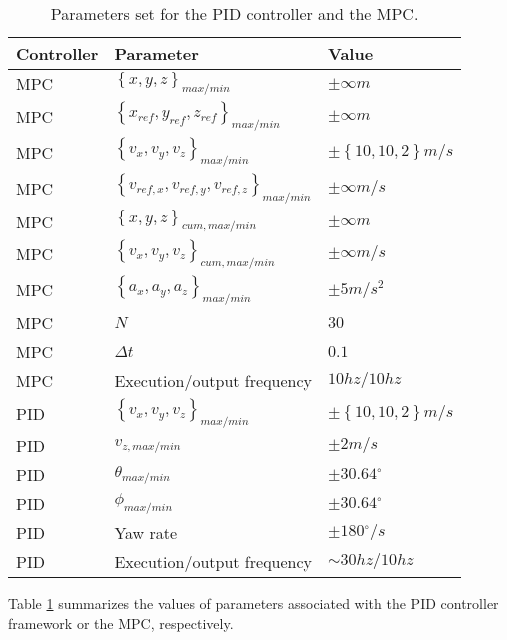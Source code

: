 \begin{table}[]
\center
\small
\caption{Parameters set for the PID controller and the MPC. \label{tab:controller_constraints}}
\begin{tabular}{@{}lll@{}}
\toprule
Controller& Parameter           & Value \\ \midrule
MPC & $ \left\lbrace x,y,z \right\rbrace_{max/min} $ & $\pm \infty \si{m}$ \\
MPC & $ \left\lbrace x_{ref},y_{ref},z_{ref} \right\rbrace_{max/min} $ & $\pm \infty \si{m}$ \\
MPC &$ \left\lbrace v_x,v_y,v_z \right\rbrace_{max/min} $ & $\pm \left\lbrace 10,10, 2\right\rbrace \si{m/s}$ \\
MPC &$ \left\lbrace v_{ref,x},v_{ref,y},v_{ref,z} \right\rbrace_{max/min} $ & $\pm \infty \si{m/s}$ \\
MPC &$ \left\lbrace x,y,z \right\rbrace_{cum,max/min} $ & $\pm \infty \si{m}$ \\
MPC &$ \left\lbrace v_x,v_y,v_z\right\rbrace_{cum,max/min}$ & $\pm \infty \si{m/s}$ \\
MPC &$ \left\lbrace a_x,a_y,a_z \right\rbrace_{max/min} $ & $\pm 5 \si{m/s^2}$ \\
MPC &$N$ & $30$\\
MPC &$\Delta t$ & $0.1$\\
MPC &Execution/output frequency & $10\si{hz}/10\si{hz}$\\

\midrule
PID &$ \left\lbrace v_x,v_y,v_z \right\rbrace_{max/min} $ & $\pm \left\lbrace 10,10, 2\right\rbrace \si{m/s}$  \\
PID &$ v_{z,max/min}$ & $\pm 2\si{m/s}$\\
PID &$ \theta_{max/min}$ & $\pm 30.64\si{^{\circ}}$\\
PID &$ \phi_{max/min}$ & $\pm 30.64\si{^{\circ}}$\\
PID &Yaw rate & $\pm 180\si{^{\circ}/s}$\\
PID &Execution/output frequency & $\sim30\si{hz}/10\si{hz}$\\
\bottomrule
\end{tabular} 
\end{table}
Table \ref{tab:controller_constraints} summarizes the values of parameters associated with the PID controller framework or the MPC, respectively.


